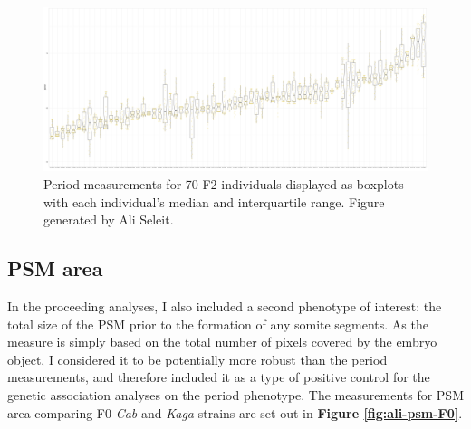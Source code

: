 \documentclass[
]{book}
\begin{document}
\begin{figure}
\includegraphics[width=1\linewidth]{figs/somites/ali_F2_mean_period} \caption{Period measurements for 70 F2 individuals displayed as boxplots with each individual's median and interquartile range. Figure generated by Ali Seleit.}\label{fig:ali-somite-period-box}
\end{figure}

\hypertarget{psm-area}{%
\subsection{PSM area}\label{psm-area}}

In the proceeding analyses, I also included a second phenotype of interest: the total size of the PSM prior to the formation of any somite segments. As the measure is simply based on the total number of pixels covered by the embryo object, I considered it to be potentially more robust than the period measurements, and therefore included it as a type of positive control for the genetic association analyses on the period phenotype. The measurements for PSM area comparing F0 \emph{Cab} and \emph{Kaga} strains are set out in \textbf{Figure \ref{fig:ali-psm-F0}}.
\end{document}
